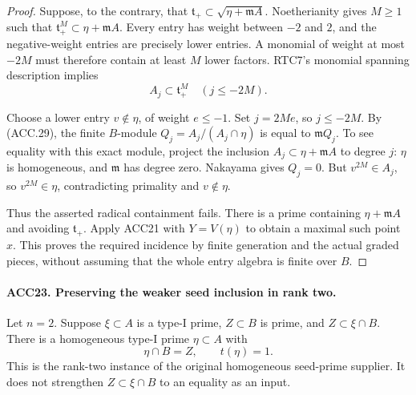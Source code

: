 \documentclass[11pt,a4paper]{article}
\numberwithin{equation}{section}
\theoremstyle{remark}\newtheorem{remark}[theorem]{Remark}
\begin{document}
\begin{proof}
Suppose, to the contrary, that
\(\mathfrak t_+\subset\sqrt{\eta+\mathfrak m A}\).
Noetherianity gives \(M\ge1\) such that
\(\mathfrak t_+^M\subset\eta+\mathfrak m A\).
Every entry has weight between \(-2\) and \(2\), and the
negative-weight entries are precisely lower entries.  A monomial
of weight at most \(-2M\) must therefore contain at least
\(M\) lower factors.  RTC7's monomial spanning description
implies
\[
                   A_j\subset\mathfrak t_+^M
                           \quad(j\le-2M).               \tag{ACC.29}
\]

Choose a lower entry \(v\notin\eta\), of weight \(e\le-1\).
Set \(j=2Me\), so \(j\le-2M\).  By (ACC.29), the finite
\(B\)-module \(Q_j=A_j/(A_j\cap\eta)\) is equal to
\(\mathfrak mQ_j\).  To see equality with this exact module,
project the inclusion \(A_j\subset\eta+\mathfrak m A\)
to degree \(j\): \(\eta\) is homogeneous, and
\(\mathfrak m\) has degree zero.  Nakayama gives \(Q_j=0\).
But \(v^{2M}\in A_j\), so \(v^{2M}\in\eta\), contradicting
primality and \(v\notin\eta\).

Thus the asserted radical containment fails.  There is a prime
containing \(\eta+\mathfrak m A\) and avoiding
\(\mathfrak t_+\).  Apply ACC21 with \(Y=V(\eta)\) to
obtain a maximal such point \(x\).  This proves the required
incidence by finite generation and the actual graded pieces, without
assuming that the whole entry algebra is finite over \(B\).
\end{proof}

\paragraph{ACC23. Preserving the weaker seed inclusion in rank two.}
\label{claim:ACC23}
Let \(n=2\).  Suppose \(\xi\subset A\) is a type-I prime,
\(Z\subset B\) is prime, and \(Z\subset\xi\cap B\).
There is a homogeneous type-I prime \(\eta\subset A\) with
\[
                         \eta\cap B=Z,\qquad t(\eta)=1.
                                                               \tag{ACC.30}
\]
This is the rank-two instance of the original homogeneous seed-prime
supplier.  It does not strengthen \(Z\subset\xi\cap B\) to
an equality as an input.
\end{document}
